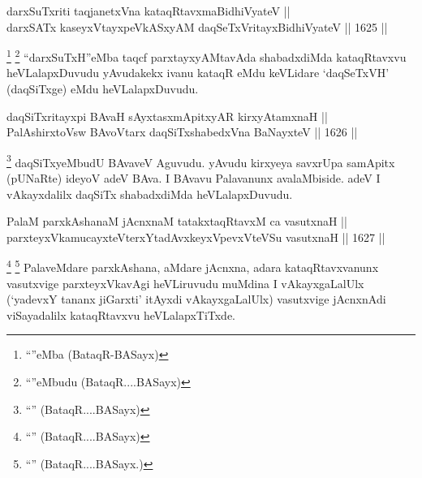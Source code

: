 
\begin{shl}
darxSuTxriti taqjanetxVna kataqRtavxmaBidhiVyateV || \\
darxSATx kaseyxVtayxpeVkASxyAM daqSeTxVritayxBidhiVyateV \hfill || 1625 ||  
\end{shl}

\begin{artha}
\footnote{``\stext''eMba (BataqR-BASayx)}
\footnote{``\stext''eMbudu (BataqR....BASayx)}
``darxSuTxH''eMba taqcf parxtayxyAMtavAda shabadxdiMda kataqRtavxvu heVLalapxDuvudu yAvudakekx ivanu kataqR eMdu keVLidare `daqSeTxVH' (daqSiTxge) eMdu heVLalapxDuvudu.
\end{artha}


\begin{shl}
daqSiTxritayxpi BAvaH sAyxtasxmApitxyAR kirxyAtamxnaH || \\
PalAshirxtoV\s sw BAvoV\s tarx daqSiTxshabedxVna BaNayxteV \hfill || 1626 ||  
\end{shl}

\begin{artha}
\footnote{``\stext'' (BataqR....BASayx)}
daqSiTxyeMbudU BAvaveV Aguvudu. yAvudu kirxyeya savxrUpa samApitx (pUNaRte) ideyoV adeV BAva. I BAvavu Palavanunx avalaMbiside. adeV I vAkayxdalilx daqSiTx shabadxdiMda heVLalapxDuvudu.
\end{artha}


\begin{shl}
PalaM parxkAshanaM jAcnxnaM tatakxtaqRtavxM ca vasutxnaH || \\
parxteyxVkamucayxteV\s terxYtadAvxkeyxVpevxVteVSu vasutxnaH \hfill || 1627 ||  
\end{shl}

\begin{artha}
\footnote{``\stext'' (BataqR....BASayx)}
\footnote{``\stext'' (BataqR....BASayx.)}
PalaveMdare parxkAshana, aMdare jAcnxna, adara kataqRtavxvanunx vasutxvige parxteyxVkavAgi heVLiruvudu muMdina I vAkayxgaLalUlx (`yadevxY tananx jiGarxti' itAyxdi vAkayxgaLalUlx) vasutxvige jAcnxnAdi viSayadalilx kataqRtavxvu heVLalapxTiTxde.
\end{artha}



